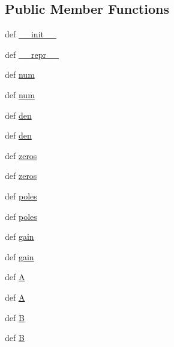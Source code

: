 \subsection*{Public Member Functions}
\begin{DoxyCompactItemize}
\item 
def \hyperlink{classscipy_1_1signal_1_1ltisys_1_1lti_ac551cbc4dfdee42b988b4c356db8ec2b}{\+\_\+\+\_\+init\+\_\+\+\_\+}
\item 
def \hyperlink{classscipy_1_1signal_1_1ltisys_1_1lti_a6316a996a2679af6d156a97545012ffc}{\+\_\+\+\_\+repr\+\_\+\+\_\+}
\item 
def \hyperlink{classscipy_1_1signal_1_1ltisys_1_1lti_a3716eb6c32e98537bffb167a294e3bd7}{num}
\item 
def \hyperlink{classscipy_1_1signal_1_1ltisys_1_1lti_a3716eb6c32e98537bffb167a294e3bd7}{num}
\item 
def \hyperlink{classscipy_1_1signal_1_1ltisys_1_1lti_ad8e8b5ee83e2b6b614e68c532e45027f}{den}
\item 
def \hyperlink{classscipy_1_1signal_1_1ltisys_1_1lti_ad8e8b5ee83e2b6b614e68c532e45027f}{den}
\item 
def \hyperlink{classscipy_1_1signal_1_1ltisys_1_1lti_a0f681cfc101d5c0e5bc25c1143abe790}{zeros}
\item 
def \hyperlink{classscipy_1_1signal_1_1ltisys_1_1lti_a0f681cfc101d5c0e5bc25c1143abe790}{zeros}
\item 
def \hyperlink{classscipy_1_1signal_1_1ltisys_1_1lti_aafab21fd1d07d46c0b141e7758a76273}{poles}
\item 
def \hyperlink{classscipy_1_1signal_1_1ltisys_1_1lti_aafab21fd1d07d46c0b141e7758a76273}{poles}
\item 
def \hyperlink{classscipy_1_1signal_1_1ltisys_1_1lti_a5616db8e6fd505d72fbd9185fc8cf3a5}{gain}
\item 
def \hyperlink{classscipy_1_1signal_1_1ltisys_1_1lti_a5616db8e6fd505d72fbd9185fc8cf3a5}{gain}
\item 
def \hyperlink{classscipy_1_1signal_1_1ltisys_1_1lti_a00e76e31952bdb82488bf1849a5653f6}{A}
\item 
def \hyperlink{classscipy_1_1signal_1_1ltisys_1_1lti_a00e76e31952bdb82488bf1849a5653f6}{A}
\item 
def \hyperlink{classscipy_1_1signal_1_1ltisys_1_1lti_a96cd7c001f47a5dc01104943e315c884}{B}
\item 
def \hyperlink{classscipy_1_1signal_1_1ltisys_1_1lti_a96cd7c001f47a5dc01104943e315c884}{B}
\item 

\end{DoxyCompactItemize}

